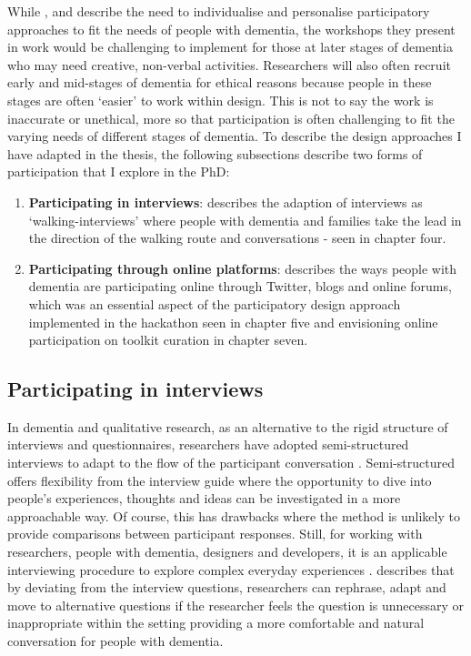 While \cite{lindsay_empathy_2012}, and \cite{stenhouse2013dangling} describe the need to individualise and personalise participatory approaches to fit the needs of people with dementia, the workshops they present in work would be challenging to implement for those at later stages of dementia who may need creative, non-verbal activities. Researchers will also often recruit early and mid-stages of dementia for ethical reasons because people in these stages are often ‘easier’ to work within design. This is not to say the work is inaccurate or unethical, more so that participation is often challenging to fit the varying needs of different stages of dementia. To describe the design approaches I have adapted in the thesis, the following subsections describe two forms of participation that I explore in the PhD: 
\begin{enumerate}

\item \textbf{Participating in interviews}: describes the adaption of interviews as `walking-interviews' where people with dementia and families take the lead in the direction of the walking route and conversations
- seen in chapter four.

\item \textbf{Participating through online platforms}: describes the ways people with dementia are participating online through Twitter, blogs and online forums, which was an essential aspect of the participatory design approach implemented in the hackathon seen in chapter five and envisioning online participation on toolkit curation in chapter seven.
\end{enumerate}

\subsection{Participating in interviews}
\label{PD:Interviews}
In dementia and qualitative research, as an alternative to the rigid structure of interviews and questionnaires, researchers have adopted semi-structured interviews to adapt to the flow of the participant conversation \citep{cheston2000involving}. Semi-structured offers flexibility from the interview guide where the opportunity to dive into people’s experiences, thoughts and ideas can be investigated in a more approachable way. Of course, this has drawbacks where the method is unlikely to provide comparisons between participant responses. Still, for working with researchers, people with dementia, designers and developers, it is an applicable interviewing procedure to explore complex everyday experiences \citep{horton2004qualitative}. \cite{samsi2020interviewing} describes that by deviating from the interview questions, researchers can rephrase, adapt and move to alternative questions if the researcher feels the question is unnecessary or inappropriate within the setting providing a more comfortable and natural conversation for people with dementia.


